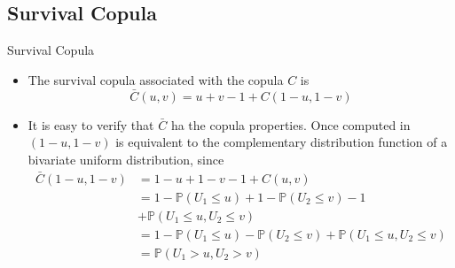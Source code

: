 \documentclass[11pt]{beamer}
\theoremstyle{plain}
\theoremstyle{definition}
\theoremstyle{remark}
\begin{document}
\subsection{Survival Copula}
%
\begin{frame}{Survival Copula}
   \begin{itemize}
      \item   				  						  
		The survival copula associated with the copula $C$ is
			\begin{equation}
			\bar C (u, v) = u + v - 1 + C(1-u, 1-v)
			\end{equation}
	  \item 
	  	It is easy to verify that $\bar C$ ha the copula properties. Once computed in $(1-u 
	  	,1-v)$ is equivalent to the complementary distribution function of a bivariate 
	  	uniform distribution, since
		\begin{equation}
			\begin{split}
			\bar C (1-u, 1- v) & = 1 - u + 1 - v - 1 + C(u, v) \\
			& = 1 - \mathbb{P} (U_1 \le u) + 1 - \mathbb{P} (U_2 \le v) - 1 \\
			& + \mathbb{P} (U_1 \le u, U_2 \le v) \\
			& = 1 - \mathbb{P} (U_1 \le u) - \mathbb{P} (U_2 \le v) + \mathbb{P} (U_1 \le u, 
			U_2 
			\le v) \\
			& = \mathbb{P} (U_1 > u, U_2 > v)
			\end{split}
	  	\end{equation}	  	
   \end{itemize}
\end{frame}
\end{document}
